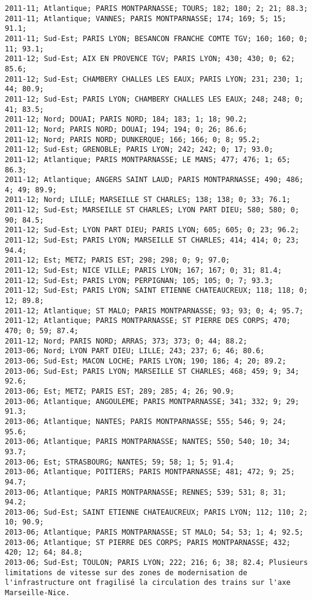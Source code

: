 \documentclass{article}
\begin{document}
\begin{Verbatim}[commandchars=\\\{\}]
2011-11; Atlantique; PARIS MONTPARNASSE; TOURS; 182; 180; 2; 21; 88.3; 
2011-11; Atlantique; VANNES; PARIS MONTPARNASSE; 174; 169; 5; 15; 91.1; 
2011-11; Sud-Est; PARIS LYON; BESANCON FRANCHE COMTE TGV; 160; 160; 0; 11; 93.1; 
2011-12; Sud-Est; AIX EN PROVENCE TGV; PARIS LYON; 430; 430; 0; 62; 85.6; 
2011-12; Sud-Est; CHAMBERY CHALLES LES EAUX; PARIS LYON; 231; 230; 1; 44; 80.9; 
2011-12; Sud-Est; PARIS LYON; CHAMBERY CHALLES LES EAUX; 248; 248; 0; 41; 83.5; 
2011-12; Nord; DOUAI; PARIS NORD; 184; 183; 1; 18; 90.2; 
2011-12; Nord; PARIS NORD; DOUAI; 194; 194; 0; 26; 86.6; 
2011-12; Nord; PARIS NORD; DUNKERQUE; 166; 166; 0; 8; 95.2; 
2011-12; Sud-Est; GRENOBLE; PARIS LYON; 242; 242; 0; 17; 93.0; 
2011-12; Atlantique; PARIS MONTPARNASSE; LE MANS; 477; 476; 1; 65; 86.3; 
2011-12; Atlantique; ANGERS SAINT LAUD; PARIS MONTPARNASSE; 490; 486; 4; 49; 89.9; 
2011-12; Nord; LILLE; MARSEILLE ST CHARLES; 138; 138; 0; 33; 76.1; 
2011-12; Sud-Est; MARSEILLE ST CHARLES; LYON PART DIEU; 580; 580; 0; 90; 84.5; 
2011-12; Sud-Est; LYON PART DIEU; PARIS LYON; 605; 605; 0; 23; 96.2; 
2011-12; Sud-Est; PARIS LYON; MARSEILLE ST CHARLES; 414; 414; 0; 23; 94.4; 
2011-12; Est; METZ; PARIS EST; 298; 298; 0; 9; 97.0; 
2011-12; Sud-Est; NICE VILLE; PARIS LYON; 167; 167; 0; 31; 81.4; 
2011-12; Sud-Est; PARIS LYON; PERPIGNAN; 105; 105; 0; 7; 93.3; 
2011-12; Sud-Est; PARIS LYON; SAINT ETIENNE CHATEAUCREUX; 118; 118; 0; 12; 89.8; 
2011-12; Atlantique; ST MALO; PARIS MONTPARNASSE; 93; 93; 0; 4; 95.7; 
2011-12; Atlantique; PARIS MONTPARNASSE; ST PIERRE DES CORPS; 470; 470; 0; 59; 87.4; 
2011-12; Nord; PARIS NORD; ARRAS; 373; 373; 0; 44; 88.2; 
2013-06; Nord; LYON PART DIEU; LILLE; 243; 237; 6; 46; 80.6; 
2013-06; Sud-Est; MACON LOCHE; PARIS LYON; 190; 186; 4; 20; 89.2; 
2013-06; Sud-Est; PARIS LYON; MARSEILLE ST CHARLES; 468; 459; 9; 34; 92.6; 
2013-06; Est; METZ; PARIS EST; 289; 285; 4; 26; 90.9; 
2013-06; Atlantique; ANGOULEME; PARIS MONTPARNASSE; 341; 332; 9; 29; 91.3; 
2013-06; Atlantique; NANTES; PARIS MONTPARNASSE; 555; 546; 9; 24; 95.6; 
2013-06; Atlantique; PARIS MONTPARNASSE; NANTES; 550; 540; 10; 34; 93.7; 
2013-06; Est; STRASBOURG; NANTES; 59; 58; 1; 5; 91.4; 
2013-06; Atlantique; POITIERS; PARIS MONTPARNASSE; 481; 472; 9; 25; 94.7; 
2013-06; Atlantique; PARIS MONTPARNASSE; RENNES; 539; 531; 8; 31; 94.2; 
2013-06; Sud-Est; SAINT ETIENNE CHATEAUCREUX; PARIS LYON; 112; 110; 2; 10; 90.9; 
2013-06; Atlantique; PARIS MONTPARNASSE; ST MALO; 54; 53; 1; 4; 92.5; 
2013-06; Atlantique; ST PIERRE DES CORPS; PARIS MONTPARNASSE; 432; 420; 12; 64; 84.8; 
2013-06; Sud-Est; TOULON; PARIS LYON; 222; 216; 6; 38; 82.4; Plusieurs limitations de vitesse sur des zones de modernisation de l'infrastructure ont fragilisé la circulation des trains sur l'axe Marseille-Nice.

\end{Verbatim}
\end{document}
